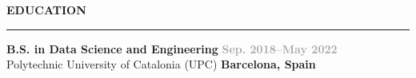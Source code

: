 
\vspace{0.3em}
{\large\bfseries\color{darkgray} EDUCATION}\\
\rule{\textwidth}{1pt}
\textbf{B.S. in Data Science and Engineering} \hfill \textbf{\textcolor{darkgray}{Sep. 2018--May 2022}}\\
Polytechnic University of Catalonia (UPC) \hfill \textbf{\textcolor{mediumgray}{Barcelona, Spain}}
\vspace{0.1em}
